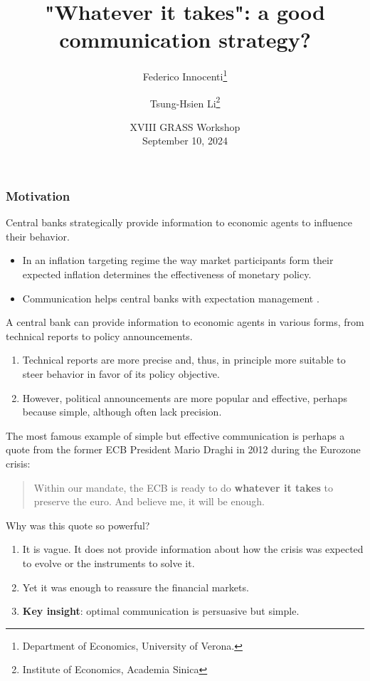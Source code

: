 \documentclass{beamer}
\begin{document}
	
\title[]{"Whatever it takes": a good communication strategy?}
	
\author{Federico Innocenti\thanks{Department of Economics, University of Verona.} \and Tsung-Hsien Li\thanks{Institute of Economics, Academia Sinica}}
\date{XVIII GRASS Workshop \\
September 10, 2024} 

\begin{frame}
	\titlepage 
\end{frame}

\begin{frame}[allowframebreaks]
\frametitle{Motivation}
Central banks strategically provide information to economic agents to influence their behavior. 
\begin{itemize}
    \item In an inflation targeting regime the way market participants form their expected inflation determines the effectiveness of monetary policy.
    \item Communication helps central banks with expectation management \citep{Casiraghi2022}.
\end{itemize}
\vskip10pt
A central bank can provide information to economic agents in various forms, from technical reports to policy announcements.
\begin{enumerate}
    \item Technical reports are more precise and, thus, in principle more suitable to steer behavior in favor of its policy objective.
    \item However, political announcements are more popular and effective, perhaps because simple, although often lack precision.
\end{enumerate} 
\framebreak
The most famous example of simple but effective communication is perhaps a quote from the former ECB President Mario Draghi in 2012 during the Eurozone crisis:
\vskip5pt
\begin{quote}
Within our mandate, the ECB is ready to do \textbf{whatever it takes} to preserve the euro. And believe me, it will be enough.
\end{quote}
\vskip5pt
Why was this quote so powerful?
\begin{enumerate}
    \item It is vague. It does not provide information about how the crisis was expected to evolve or the instruments to solve it. 
    \item Yet it was enough to reassure the financial markets.
    \item \textbf{Key insight}: optimal communication is persuasive but simple.

\end{enumerate}
\end{frame}
\end{document}
